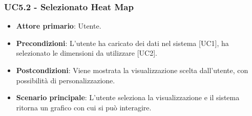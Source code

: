\subsubsection{UC5.2 - Selezionato Heat Map}
\begin{itemize}
	\item \textbf{Attore primario}: Utente.
	\item \textbf{Precondizioni}: L'utente ha caricato dei dati nel sistema [UC1], ha selezionato le dimensioni da utilizzare [UC2].
	\item \textbf{Postcondizioni}: Viene mostrata la visualizzazione  scelta dall'utente, con possibilità di personalizzazione.
	\item \textbf{Scenario principale}: L'utente seleziona la visualizzazione  e il sistema ritorna un grafico con cui si può interagire.

\end{itemize}